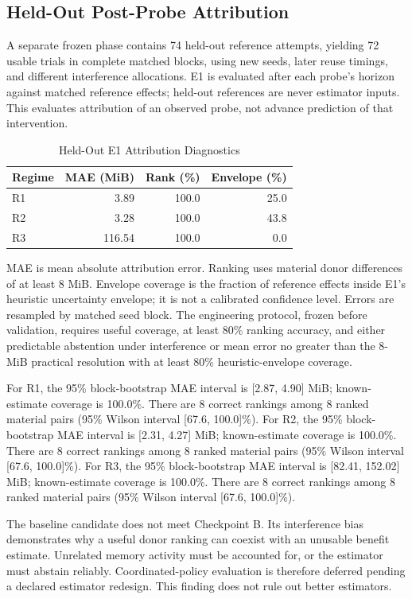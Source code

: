 \documentclass[conference]{IEEEtran}
\begin{document}
\subsection{Held-Out Post-Probe Attribution}
A separate frozen phase contains 74 held-out reference attempts, yielding 72 usable trials in complete matched blocks, using new seeds, later reuse timings, and different interference allocations. E1 is evaluated after each probe's horizon against matched reference effects; held-out references are never estimator inputs. This evaluates attribution of an observed probe, not advance prediction of that intervention.

\begin{table}[t]
\caption{Held-Out E1 Attribution Diagnostics}
\label{tab:estimator}
\centering\small
\begin{tabular}{@{}lrrr@{}}
\toprule
Regime & MAE (MiB) & Rank (\%) & Envelope (\%) \\
\midrule
R1 & 3.89 & 100.0 & 25.0 \\
R2 & 3.28 & 100.0 & 43.8 \\
R3 & 116.54 & 100.0 & 0.0 \\
\bottomrule
\end{tabular}
\end{table}
MAE is mean absolute attribution error. Ranking uses material donor differences of at least 8 MiB. Envelope coverage is the fraction of reference effects inside E1's heuristic uncertainty envelope; it is not a calibrated confidence level. Errors are resampled by matched seed block. The engineering protocol, frozen before validation, requires useful coverage, at least 80\% ranking accuracy, and either predictable abstention under interference or mean error no greater than the 8-MiB practical resolution with at least 80\% heuristic-envelope coverage.

For R1, the 95\% block-bootstrap MAE interval is [2.87, 4.90] MiB; known-estimate coverage is 100.0\%. There are 8 correct rankings among 8 ranked material pairs (95\% Wilson interval [67.6, 100.0]\%). For R2, the 95\% block-bootstrap MAE interval is [2.31, 4.27] MiB; known-estimate coverage is 100.0\%. There are 8 correct rankings among 8 ranked material pairs (95\% Wilson interval [67.6, 100.0]\%). For R3, the 95\% block-bootstrap MAE interval is [82.41, 152.02] MiB; known-estimate coverage is 100.0\%. There are 8 correct rankings among 8 ranked material pairs (95\% Wilson interval [67.6, 100.0]\%). 

The baseline candidate does not meet Checkpoint B. Its interference bias demonstrates why a useful donor ranking can coexist with an unusable benefit estimate. Unrelated memory activity must be accounted for, or the estimator must abstain reliably. Coordinated-policy evaluation is therefore deferred pending a declared estimator redesign. This finding does not rule out better estimators.
\end{document}
